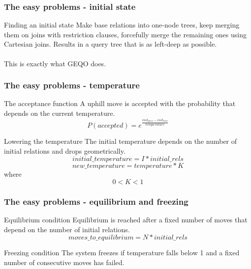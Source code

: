 \documentclass{beamer}
\begin{document}
\begin{frame}
  \frametitle{The easy problems - initial state}

  \begin{block}{Finding an initial state}
    Make base relations into one-node trees, keep merging them on joins with
    restriction clauses, forcefully merge the remaining ones using Cartesian
    joins. Results in a query tree that is as left-deep as possible.
    \\
    \hfill
    \\
    This is exactly what GEQO does.
  \end{block}
\end{frame}

\begin{frame}
  \frametitle{The easy problems - temperature}

  \begin{block}{The acceptance function}
    A uphill move is accepted with the probability that depends on the current temperature.
    $$P(accepted) = e^{\frac{cost_{prev} - cost_{new}}{temperature}}$$
  \end{block}

  \begin{block}{Lowering the temperature}
    The initial temperature depends on the number of initial relations and
    drops geometrically.
    $$initial\_temperature = I * initial\_rels$$
    $$new\_temperature = temperature * K$$ where $$0 < K < 1$$
  \end{block}
\end{frame}

\begin{frame}
  \frametitle{The easy problems - equilibrium and freezing}

  \begin{block}{Equilibrium condition}
    Equilibrium is reached after a fixed number of moves that depend on the
    number of initial relations.
    $$moves\_to\_equilibrium = N * initial\_rels$$
  \end{block}

  \begin{block}{Freezing condition}
    The system freezes if temperature falls below 1 and a fixed number of
    consecutive moves has failed.
  \end{block}
\end{frame}
\end{document}
